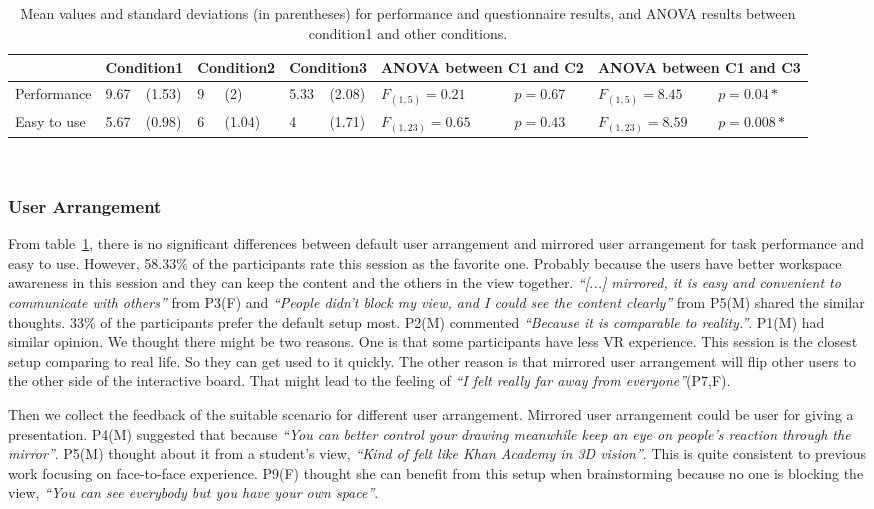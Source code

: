 \documentclass{sigchi}
\begin{document}
\begin{table}
  \centering
  \begin{tabular}{l l l l l l l l l l l}
    & \multicolumn{2}{c}{Condition1} & \multicolumn{2}{c}{Condition2} & \multicolumn{2}{c}{Condition3} & \multicolumn{2}{c}{ANOVA between C1 and C2} & \multicolumn{2}{c}{ANOVA between C1 and C3} \\
    \midrule
    Performance & 9.67 & (1.53) & 9 & (2) & 5.33 & (2.08) & $F_{(1,5)} = 0.21$ & $p = 0.67$ & $F_{(1,5)} =8.45$ & $p = 0.04*$\\
    Easy to use & 5.67 & (0.98) & 6 & (1.04) & 4 & (1.71) & $F_{(1,23)}=0.65$ & $p=0.43$ & $F_{(1,23)}=8.59$ & $p=0.008*$\\
  \end{tabular}
  \caption{Mean values and standard deviations (in parentheses) for performance and questionnaire results, and ANOVA results between condition1 and other conditions.}~\label{tab:result}
\end{table}

\subsubsection{User Arrangement}
From table~\ref{tab:result}, there is no significant differences between default user arrangement and mirrored user arrangement for task performance and easy to use. However, 58.33\% of the participants rate this session as the favorite one. Probably because the users have better workspace awareness in this session and they can keep the content and the others in the view together. \textit{``[...] mirrored, it is easy and convenient to communicate with others''} from P3(F) and \textit{``People didn't block my view, and I could see the content clearly''} from P5(M) shared the similar thoughts. 33\% of the participants prefer the default setup most. P2(M) commented \textit{``Because it is comparable to reality.''}. P1(M) had similar opinion. We thought there might be two reasons. One is that some participants have less VR experience. This session is the closest setup comparing to real life. So they can get used to it quickly. The other reason is that mirrored user arrangement will flip other users to the other side of the interactive board. That might lead to the feeling of \textit{``I felt really far away from everyone''}(P7,F).

Then we collect the feedback of the suitable scenario for different user arrangement. Mirrored user arrangement could be user for giving a presentation. P4(M) suggested that because \textit{``You can better control your drawing meanwhile keep an eye on people's reaction through the mirror''}. P5(M) thought about it from a student's view, \textit{``Kind of felt like Khan Academy in 3D vision''}. This is quite consistent to previous work focusing on face-to-face experience. P9(F) thought she can benefit from this setup when brainstorming because no one is blocking the view, \textit{``You can see everybody but you have your own space''}.
\end{document}

